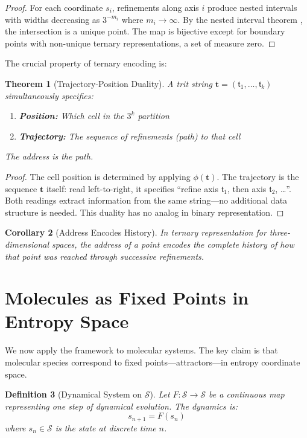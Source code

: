 \documentclass[twocolumn,10pt,a4paper]{article}
\newtheorem{theorem}{Theorem}[section]
\newtheorem{corollary}[theorem]{Corollary}
\newtheorem{definition}[theorem]{Definition}
\newcommand{\Sspace}{\mathcal{S}}
\newcommand{\trit}{\mathfrak{t}}
\begin{document}
\begin{proof}
For each coordinate $s_i$, refinements along axis $i$ produce nested intervals with widths decreasing as $3^{-m_i}$ where $m_i \to \infty$. By the nested interval theorem \citep{cantor1872ueber}, the intersection is a unique point. The map is bijective except for boundary points with non-unique ternary representations, a set of measure zero.
\end{proof}

The crucial property of ternary encoding is:

\begin{theorem}[Trajectory-Position Duality]
\label{thm:traj_pos}
A trit string $\mathbf{t} = (\trit_1, \ldots, \trit_k)$ simultaneously specifies:
\begin{enumerate}[label=(\roman*)]
    \item \textbf{Position:} Which cell in the $3^k$ partition
    \item \textbf{Trajectory:} The sequence of refinements (path) to that cell
\end{enumerate}
The address is the path.
\end{theorem}

\begin{proof}
The cell position is determined by applying $\phi(\mathbf{t})$. The trajectory is the sequence $\mathbf{t}$ itself: read left-to-right, it specifies ``refine axis $\trit_1$, then axis $\trit_2$, \ldots''. Both readings extract information from the same string---no additional data structure is needed. This duality has no analog in binary representation.
\end{proof}

\begin{corollary}[Address Encodes History]
In ternary representation for three-dimensional spaces, the address of a point encodes the complete history of how that point was reached through successive refinements.
\end{corollary}

\section{Molecules as Fixed Points in Entropy Space}
\label{sec:fixed_points}

We now apply the framework to molecular systems. The key claim is that molecular species correspond to fixed points---attractors---in entropy coordinate space.

\begin{definition}[Dynamical System on $\Sspace$]
Let $F: \Sspace \to \Sspace$ be a continuous map representing one step of dynamical evolution. The dynamics is:
\begin{equation}
s_{n+1} = F(s_n)
\end{equation}
where $s_n \in \Sspace$ is the state at discrete time $n$.
\end{definition}
\end{document}
